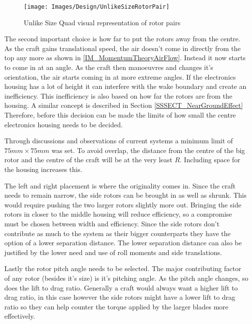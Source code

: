 			\begin{figure}[H]
			\centering
			\texttt{[image: Images/Design/UnlikeSizeRotorPair]}
			\caption{Unlike Size Quad visual representation of rotor pairs}
			\label{IM_UnlikeSizePair}
			\end{figure}
			
			The second important choice is how far to put the rotors away from the centre. As the craft gains translational speed, the air doesn't come in directly from the top any more as shown in \ref{IM_MomentumTheoryAirFlow}. Instead it now starts to come in at an angle. As the craft then manoeuvres and changes it's orientation, the air starts coming in at more extreme angles. If the electronics housing has a lot of height it can interfere with the wake boundary and create an inefficiency. This inefficiency is also based on how far the rotors are from the housing. A similar concept is described in Section \ref{SSSECT_NearGroundEffect} Therefore, before this decision can be made the limits of how small the centre electronics housing needs to be decided. 
			
			Through discussions and observations of current systems a minimum limit of $75mm \times 75mm$ was set. To avoid overlap, the distance from the centre of the big rotor and the centre of the craft will be at the very least $R$. Including space for the housing increases this.
			
			The left and right placement is where the originality comes in. Since the craft needs to remain narrow, the side rotors can be brought in as well as shrunk. This would require pushing the two larger rotors slightly more out. Bringing the side rotors in closer to the middle housing will reduce efficiency, so a compromise must be chosen between width and efficiency. Since the side rotors don't contribute as much to the system as their bigger counterparts they have the option of a lower separation distance. The lower separation distance can also be justified by the lower need and use of roll moments and side translations.
			
			Lastly the rotor pitch angle needs to be selected. The major contributing factor of any rotor (besides it's size) is it's pitching angle. As the pitch angle changes, so does the lift to drag ratio. Generally a craft would always want a higher lift to drag ratio, in this case however the side rotors might have a lower lift to drag ratio so they can help counter the torque applied by the larger blades more effectively.
	
